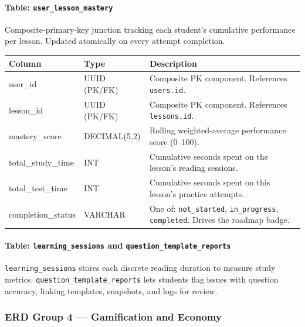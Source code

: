 \paragraph{Table: \texttt{user\_lesson\_mastery}}
Composite-primary-key junction tracking each student's cumulative performance per lesson. Updated atomically on every attempt completion.

\begin{longtable}{|p{4.2cm}|p{3cm}|p{6.8cm}|}
\hline \textbf{Column} & \textbf{Type} & \textbf{Description} \\ \hline
user\_id & UUID (PK/FK) & Composite PK component. References \texttt{users.id}. \\ \hline
lesson\_id & UUID (PK/FK) & Composite PK component. References \texttt{lessons.id}. \\ \hline
mastery\_score & DECIMAL(5,2) & Rolling weighted-average performance score (0--100). \\ \hline
total\_study\_time & INT & Cumulative seconds spent on the lesson's reading sessions. \\ \hline
total\_test\_time & INT & Cumulative seconds spent on this lesson's practice attempts. \\ \hline
completion\_status & VARCHAR & One of: \texttt{not\_started}, \texttt{in\_progress}, \texttt{completed}. Drives the roadmap badge. \\ \hline
\end{longtable}

\paragraph{Table: \texttt{learning\_sessions} and \texttt{question\_template\_reports}}
\texttt{learning\_sessions} stores each discrete reading duration to measure study metrics. \texttt{question\_template\_reports} lets students flag issues with question accuracy, linking templates, snapshots, and logs for review.

\subsubsection{ERD Group 4 --- Gamification and Economy}

